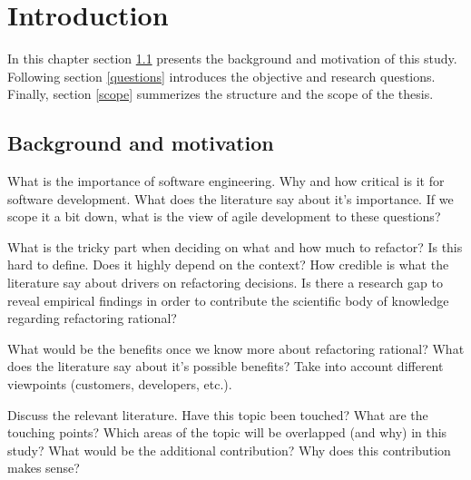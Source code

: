 \documentclass[english,12pt,a4paper,pdftex,sci,utf8]{aaltothesis}
\begin{document}


\newpage


\thesistableofcontents


\cleardoublepage
\storeinipagenumber
{}
\setcounter{page}{1}


\section{Introduction} \label{introduction}
In this chapter section \ref{background} presents the background and motivation of this study. Following section \ref{questions} introduces the objective and research questions. Finally, section \ref{scope} summerizes the structure and the scope of the thesis. 
\subsection{Background and motivation} \label{background}
What is the importance of software engineering. Why and how critical is it for software development. What does the literature say about it's importance. If we scope it a bit down, what is the view of agile development to these questions?

What is the tricky part when deciding on what and how much to refactor? Is this hard to define. Does it highly depend on the context? How credible is what the literature say about drivers on refactoring decisions. Is there a research gap to reveal empirical findings in order to contribute the scientific body of knowledge regarding refactoring rational?

What would be the benefits once we know more about refactoring rational? What does the literature say about it's possible benefits? Take into account different viewpoints (customers, developers, etc.).

Discuss the relevant literature. Have this topic been touched? What are the touching points? Which areas of the topic will be overlapped (and why) in this study? What would be the additional contribution? Why does this contribution makes sense?
\end{document}
